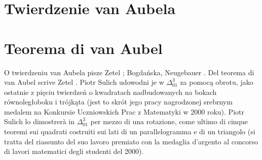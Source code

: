 %

\section{Twierdzenie van Aubela} %
\section{Teorema di van Aubel} %
O twierdzeniu van Aubela pisze Zetel \cite[s. 24]{zetel_2020}; Bogdańska, Neugebauer \cite[s. 128]{neugebauer_2018}. %
Del teorema di van Aubel scrive Zetel \cite[p. 24]{zetel_2020}. %
Piotr Sulich udowodni je w $\Delta_{01}^{3}$ za pomocą obrotu, jako ostatnie z pięciu twierdzeń o kwadratach nadbudowanych na bokach równoległoboku i trójkąta (jest to skrót jego pracy nagrodzonej srebrnym medalem na Konkursie Uczniowskich Prac z Matematyki w 2000 roku). %
Piotr Sulich lo dimostrerà in $\Delta_{01}^{3}$ per mezzo di una rotazione, come ultimo di cinque teoremi sui quadrati costruiti sui lati di un parallelogramma e di un triangolo (si tratta del riassunto del suo lavoro premiato con la medaglia d'argento al concorso di lavori matematici degli studenti del 2000). %

%